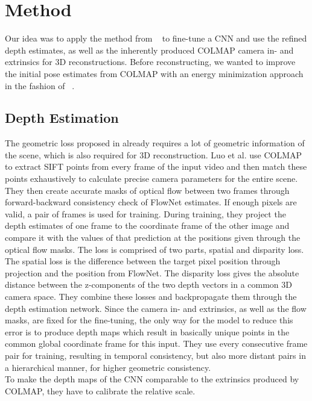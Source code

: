 \chapter{Method}
    Our idea was to apply the method from ~\cite{luo2020consistent} to fine-tune a CNN and use the refined depth estimates, as well as the inherently produced COLMAP camera in- and extrinsics for 3D reconstructions.
    Before reconstructing, we wanted to improve the initial pose estimates from COLMAP with an energy minimization approach in the fashion of ~\cite{dai2017bundlefusion}.

    \section{Depth Estimation}
        The geometric loss proposed in  already requires a lot of geometric information of the scene, which is also required for 3D reconstruction.
        Luo et al. use COLMAP to extract SIFT points from every frame of the input video and then match these points exhaustively to calculate precise camera parameters for the entire scene.
        They then create accurate masks of optical flow between two frames through forward-backward consistency check of FlowNet estimates.
        If enough pixels are valid, a pair of frames is used for training.
        During training, they project the depth estimates of one frame to the coordinate frame of the other image and compare it with the values of that prediction at the positions given through the optical flow masks.
        The loss is comprised of two parts, spatial and disparity loss.
        The spatial loss is the difference between the target pixel position through projection and the position from FlowNet.
        The disparity loss gives the absolute distance between the z-components of the two depth vectors in a common 3D camera space.
        They combine these losses and backpropagate them through the depth estimation network.
        Since the camera in- and extrinsics, as well as the flow masks, are fixed for the fine-tuning, the only way for the model to reduce this error is to produce depth maps which result in basically unique points in the common global coordinate frame for this input.
        They use every consecutive frame pair for training, resulting in temporal consistency, but also more distant pairs in a hierarchical manner, for higher geometric consistency.\\
        To make the depth maps of the CNN comparable to the extrinsics produced by COLMAP, they have to calibrate the relative scale.
